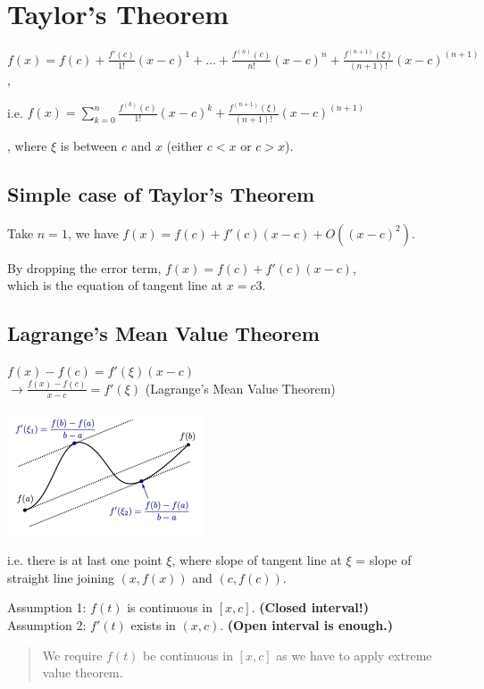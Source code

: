 \section{Taylor's Theorem}

$ f(x) = f(c) + \frac{f'(c)}{1!} (x-c)^1 + \dots + \frac{f^{(n)}(c)}{n!}(x-c)^n + \frac{f^{(n+1)}(\xi)}{(n+1)!}(x-c)^{(n+1)} $,

i.e. $f(x) = \sum_{k=0}^n \frac{f^{(k)}(c)}{1!} (x-c)^k + \frac{f^{(n+1)}(\xi)}{(n+1)!}(x-c)^{(n+1)} $

, where $\xi$ is between $c$ and $x$ (either $c < x$ or $c > x$).

\subsection{Simple case of Taylor's Theorem}

Take $n = 1$, we have
$f(x) = f(c) + f'(c) (x - c) + O((x - c)^2)$.

By dropping the error term,
$f(x) = f(c) + f'(c) (x - c)$,\\
which is the equation of tangent line at $x = c3$.

\subsection{Lagrange's Mean Value Theorem}

$ f(x) - f(c) = f'(\xi)(x-c) $\\
$\rightarrow \frac{f(x)-f(c)}{x-c} = f'(\xi)$ (Lagrange's Mean Value Theorem)

\includegraphics{MVT.png}

i.e. there is at last one point $\xi$, where slope of tangent line at $\xi$ = slope of straight line joining $(x, f(x))$ and $(c, f(c)) $.

Assumption 1: $f(t)$ is continuous in $[x, c]$. \textbf{(Closed interval!)}\\
Assumption 2: $f'(t)$ exists in $(x, c)$. \textbf{(Open interval is enough.)}

\begin{quote}
    We require $f(t)$ be continuous in $[x, c]$ as we have to apply extreme value theorem.
\end{quote}

